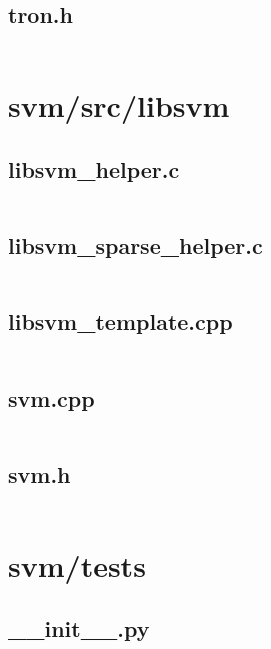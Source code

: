 \documentclass{article}
\begin{document}
\subsection{tron.h}
\inputminted{c}{/home/dufferzafar/dev/@clones/scikit-learn/sklearn/svm/src/liblinear/tron.h}
\newpage

\section{svm/src/libsvm}

\subsection{libsvm\_helper.c}
\inputminted{c}{/home/dufferzafar/dev/@clones/scikit-learn/sklearn/svm/src/libsvm/libsvm_helper.c}
\newpage

\subsection{libsvm\_sparse\_helper.c}
\inputminted{c}{/home/dufferzafar/dev/@clones/scikit-learn/sklearn/svm/src/libsvm/libsvm_sparse_helper.c}
\newpage

\subsection{libsvm\_template.cpp}
\inputminted{cpp}{/home/dufferzafar/dev/@clones/scikit-learn/sklearn/svm/src/libsvm/libsvm_template.cpp}
\newpage

\subsection{svm.cpp}
\inputminted{cpp}{/home/dufferzafar/dev/@clones/scikit-learn/sklearn/svm/src/libsvm/svm.cpp}
\newpage

\subsection{svm.h}
\inputminted{c}{/home/dufferzafar/dev/@clones/scikit-learn/sklearn/svm/src/libsvm/svm.h}
\newpage

\section{svm/tests}

\subsection{\_\_init\_\_.py}
\inputminted{python}{/home/dufferzafar/dev/@clones/scikit-learn/sklearn/svm/tests/__init__.py}
\newpage
\end{document}
